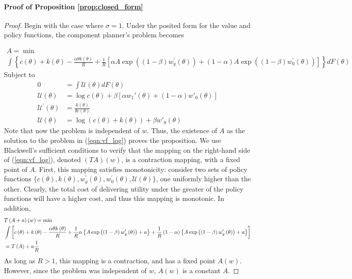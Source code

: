 \documentclass[11pt]{article}
\newcommand{\p}{\prime}
\begin{document}
\paragraph{Proof of Proposition \ref{prop:closed_form}}
\begin{proof}
    
    Begin with the case where \( \sigma = 1 \). Under the posited form for the value and policy functions, the component planner's problem becomes
    
    \begin{multline}
        A=\min\\\int\left\{ c\left(\theta\right)+k\left(\theta\right)-\frac{\alpha\theta k\left(\theta\right)}{R}+\frac{1}{R}\left[\alpha A\exp\left(\left(1-\beta\right)w_{y}^{\prime}\left(\theta\right)\right)+\left(1-\alpha\right)A\exp\left(\left(1-\beta\right)w_{0}^{\prime}\left(\theta\right)\right)\right]\right\} dF\left(\theta\right) \label{eqn:vf_log}
    \end{multline}
    Subject to 
    \begin{align*}
        0&=\int\mathcal{U}\left(\theta\right)dF\left(\theta\right)\\
        \mathcal{U}\left(\theta\right)&=\log c\left(\theta\right)+ \beta\left[\alpha w_{1}'\left(\theta\right)+\left(1-\alpha\right)w'_{0}\left(\theta\right)\right]\\
        \mathcal{U}^{\prime}\left(\theta\right)&=\frac{k\left(\theta\right)}{\theta c\left(\theta\right)}\\
        \mathcal{U}\left(\underline{\theta}\right)&=\log\left(c\left(\theta\right)+k\left(\theta\right)\right)+\beta w'_{0}\left(\theta\right)
    \end{align*}
    Note that now the problem is independent of \( w \). Thus, the existence of \( A \) as the solution to the problem in (\ref{eqn:vf_log}) proves the proposition. We use Blackwell's sufficient conditions to verify that the mapping on the right-hand side of (\ref{eqn:vf_log}), denoted \( (TA)(w) \), is a contraction mapping, with a fixed point of \( A \). First, this mapping satisfies monotonicity: consider two sets of policy functions \( \{c(\theta), k(\theta), w_y^\p(\theta), w_0^\p(\theta), \mathcal{U}(\theta)\} \), one uniformly higher than the other. Clearly, the total cost of delivering utility under the greater of the policy functions will have a higher cost, and thus this mapping is monotonic. In addition, 
    \begin{align*}
        &T\left(A+a\right)\left(w\right)=\text{\ensuremath{\min}} \\ &\int\left[c\left(\theta\right)+k\left(\theta\right)-\frac{\alpha\theta k\left(\theta\right)}{R}+\frac{1}{R}\alpha\left\{ A\exp\left(\left(1-\beta\right)w_{y}^{\prime}\left(\theta\right)\right)+a\right\} +\frac{1}{R}\left(1-\alpha\right)\left\{ A\exp\left(\left(1-\beta\right)w_{y}^{\prime}\left(\theta\right)\right)+a\right\} \right]\\
        &=T\left(A\right)+a\frac{1}{R}
    \end{align*}
    As long as \( R>1 \), this mapping is a contraction, and has a fixed point \( A(w) \). However, since the problem was independent of \( w \), \( A(w) \) is a constant \( A \). 


\end{proof}
\end{document}
